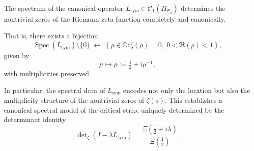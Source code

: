 \begin{corollary}
\label{cor:spectral-determines-zeta}
The spectrum of the canonical operator \( L_{\mathrm{sym}} \in \mathcal{C}_1(H_{\Psi_\alpha}) \) determines the nontrivial zeros of the Riemann zeta function completely and canonically.

That is, there exists a bijection
\[
\operatorname{Spec}(L_{\mathrm{sym}}) \setminus \{0\}
\;\longleftrightarrow\;
\left\{ \rho \in \mathbb{C} : \zeta(\rho) = 0, \; 0 < \Re(\rho) < 1 \right\},
\]
given by
\[
\mu \mapsto \rho := \tfrac{1}{2} + i \mu^{-1},
\]
with multiplicities preserved.

\medskip
\noindent
In particular, the spectral data of \( L_{\mathrm{sym}} \) encodes not only the location but also the multiplicity structure of the nontrivial zeros of \( \zeta(s) \). This establishes a canonical spectral model of the critical strip, uniquely determined by the determinant identity
\[
\det\nolimits_\zeta(I - \lambda L_{\mathrm{sym}}) = \frac{\Xi\left( \tfrac{1}{2} + i\lambda \right)}{\Xi\left( \tfrac{1}{2} \right)}.
\]
\end{corollary}
